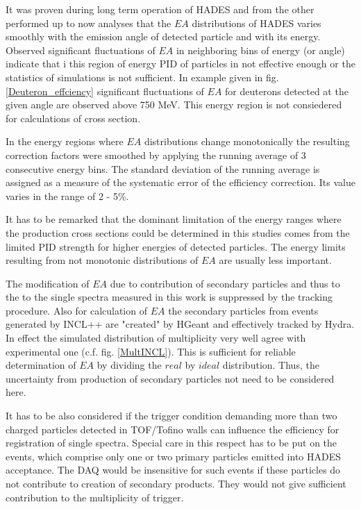 It was proven during long term operation of HADES and from the other performed up to now analyses 
that the $EA$ distributions of HADES varies smoothly with the emission angle of detected particle and with its energy. Observed significant fluctuations of $EA$
in neighboring bins of energy (or angle) indicate that 
i this region of energy PID of particles in not effective enough or the statistics of simulations is not sufficient. In example given in fig. \ref{Deuteron_effciency} significant fluctuations of $EA$ for deuterons detected at the given angle  
are observed above 750 MeV. This energy region is not consiedered for calculations of cross section.

In the energy regions where $EA$ distributions change monotonically the resulting correction factors were smoothed by applying the running average 
of 3 consecutive energy bins.
The standard deviation of the running average is assigned as a measure of the systematic error of the efficiency correction. 
Its value varies in the range of 2 - 5\%.

It has to be remarked that the dominant limitation of the energy ranges where the production cross sections could be determined in this studies comes from the limited PID strength for higher energies of detected particles. The energy limits resulting from not monotonic distributions of $EA$ are usually less important.

The modification of $EA$ due to contribution of secondary particles and thus to the to the single spectra measured in this work is suppressed by the
tracking procedure. Also for calculation of $EA$ the 
secondary particles from events generated by INCL++ 
are "created" by HGeant and effectively tracked by Hydra. In effect the simulated distribution of multiplicity very well agree with experimental one (c.f. fig. \ref{MultINCL}). This is sufficient for
reliable determination of $EA$ by dividing the $real$ by $ideal$ distribution. Thus, the uncertainty from 
production of secondary particles not need to be considered here.

It has to be also considered if the trigger condition
demanding more than two charged particles detected 
in TOF/Tofino walls can influence the efficiency for registration of single spectra. 
Special care in this respect has to be put on the events, which comprise only one or two 
primary particles emitted into HADES acceptance.
The DAQ would be insensitive for such events if  
these particles do not contribute to creation of 
secondary products. They would not give sufficient contribution to the multiplicity of trigger.

